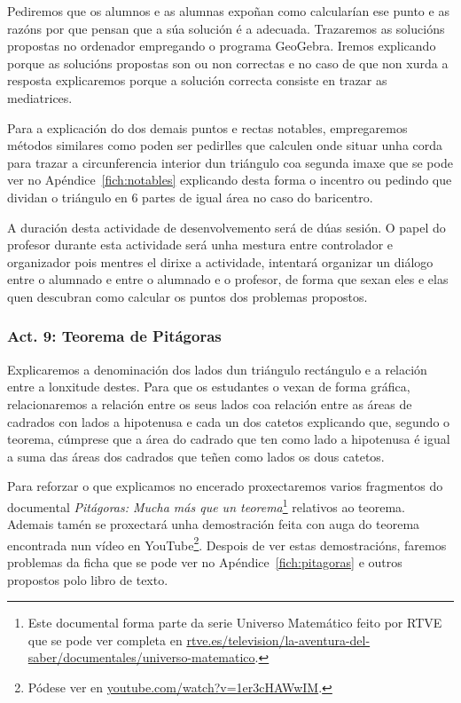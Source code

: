 Pediremos que os alumnos e as alumnas expoñan como calcularían ese punto e as razóns por que pensan que a súa solución é a adecuada. Trazaremos as solucións propostas no ordenador empregando o programa GeoGebra. Iremos explicando porque as solucións propostas son ou non correctas e no caso de que non xurda a resposta explicaremos porque a solución correcta consiste en trazar as mediatrices.

Para a explicación do dos demais puntos e rectas notables, empregaremos métodos similares como poden ser pedirlles que calculen onde situar unha corda para trazar a circunferencia interior dun triángulo coa segunda imaxe que se pode ver no Apéndice~\ref{fich:notables} explicando desta forma o incentro ou pedindo que dividan o triángulo en 6 partes de igual área no caso do baricentro.

A duración desta actividade de desenvolvemento será de dúas sesión. O papel do profesor durante esta actividade será unha mestura entre controlador e organizador pois mentres el dirixe a actividade, intentará organizar un diálogo entre o alumnado e entre o alumnado e o profesor, de forma que sexan eles e elas quen descubran como calcular os puntos dos problemas propostos.

\subsubsection{Act. 9: Teorema de Pitágoras}\label{act:pitagoras}
Explicaremos a denominación dos lados dun triángulo rectángulo e a relación entre a lonxitude destes. Para que os estudantes o vexan de forma gráfica, relacionaremos a relación entre os seus lados coa relación entre as áreas de cadrados con lados a hipotenusa e cada un dos catetos explicando que, segundo o teorema, cúmprese que a área do cadrado  que ten como lado a hipotenusa é igual a suma das áreas dos cadrados que teñen como lados os dous catetos.

Para reforzar o que explicamos no encerado proxectaremos varios fragmentos do documental \emph{Pitágoras: Mucha más que un teorema}\footnote{Este documental forma parte da serie Universo Matemático feito por RTVE que se pode ver completa en \href{http://www.rtve.es/television/la-aventura-del-saber/documentales/universo-matematico/}{rtve.es/television/la-aventura-del-saber/documentales/universo-matematico}.} relativos ao teorema. Ademais tamén se proxectará unha demostración feita con auga do teorema encontrada nun vídeo en YouTube\footnote{Pódese ver en \href{https://www.youtube.com/watch?v=1er3cHAWwIM}{youtube.com/watch?v=1er3cHAWwIM}.}. Despois de ver estas demostracións, faremos problemas da ficha que se pode ver no Apéndice~\ref{fich:pitagoras} e outros propostos polo libro de texto.

